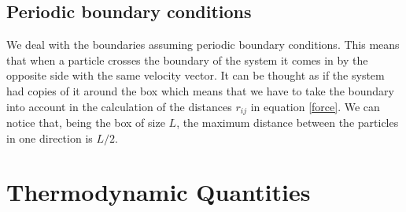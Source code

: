 \documentclass[aps,prl,reprint,groupedaddress]{revtex4-1}
\begin{document}
\subsection{Periodic boundary conditions}

We deal with the boundaries assuming periodic boundary conditions. This means that when a particle crosses the boundary of the system it comes in by the opposite side with the same velocity vector. It can be thought as if the system had copies of it around the box which means that we have to take the boundary into account in the calculation of the distances $r_{ij}$ in equation \ref{force}. We can notice that, being the box of size $L$, the maximum distance between the particles in one direction is $L/2$.

\section{Thermodynamic Quantities \label{thermo}}
\end{document}

